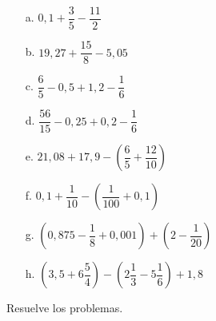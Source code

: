 \documentclass[spanish,letterpaper, 11pt, addpoints, answers]{exam}
\begin{document}
\begin{questions}
\begin{multicols}{2}
 
  \begin{itemize}
    \item[a.] $0{,}1+\dfrac{3}{5}-\dfrac{11}{2}$
    \item[b.] $19{,}27+\dfrac{15}{8}-5{,}05$
    \item[c.] $\dfrac{6}{5}-0{,}5+1{,}2-\dfrac{1}{6}$
    \item[d.] $\dfrac{56}{15}-0{,}25+0{,}2-\dfrac{1}{6}$
    \item[e.] $21{,}08+17{,}9-\left(\dfrac{6}{5}+\dfrac{12}{10}\right)$
    \item[f.] $0{,}1+\dfrac{1}{10}-\left(\dfrac{1}{100}+0{,}1\right)$
    \item[g.] $\left(0{,}875-\dfrac{1}{8}+0{,}001\right)+\left(2-\dfrac{1}{20}\right)$
    \item[h.] $\left(3{,}5+6\dfrac{5}{4}\right)-\left(2\dfrac{1}{3}-5\dfrac{1}{6}\right)+1{,}8$
  \end{itemize}
 \end{multicols}

\question Resuelve los problemas.


\end{questions}
\end{document}
